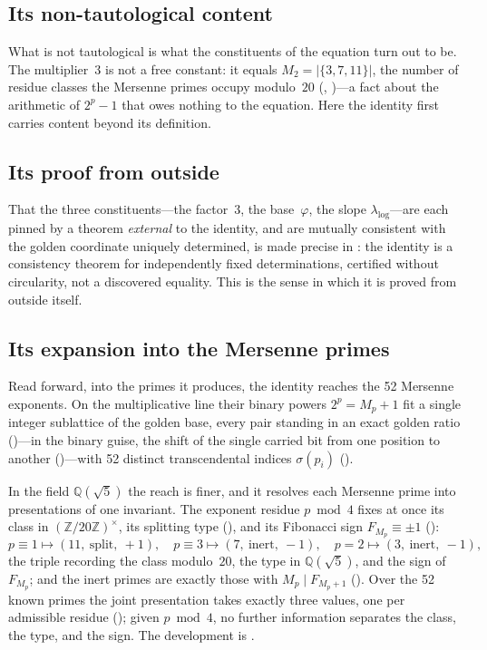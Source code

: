 \documentclass[11pt]{amsart}
\theoremstyle{definition}
\newcommand{\golden}{\varphi}
\newcommand{\Mp}{M_{p}}
\newcommand{\Ztwenty}{(\mathbb{Z}/20\mathbb{Z})^{\times}}
\begin{document}
\subsection*{Its non-tautological content}
What is not tautological is what the constituents of the equation turn out
to be.  The multiplier~$3$ is not a free constant: it equals
$M_{2}=|\{3,7,11\}|$, the number of residue classes the Mersenne primes
occupy modulo~$20$ (,
)---a fact about the arithmetic of $2^{p}-1$ that owes
nothing to the equation.  Here the identity first carries content beyond
its definition.

\subsection*{Its proof from outside}
That the three constituents---the factor~$3$, the base~$\golden$, the slope
$\lambda_{\log}$---are each pinned by a theorem \emph{external} to the
identity, and are mutually consistent with the golden coordinate uniquely
determined, is made precise in : the identity is
a consistency theorem for independently fixed determinations, certified
without circularity, not a discovered equality.  This is the sense in which
it is proved from outside itself.

\subsection*{Its expansion into the Mersenne primes}
Read forward, into the primes it produces, the identity reaches the 52
Mersenne exponents.  On the multiplicative line their binary powers
$2^{p}=\Mp+1$ fit a single integer sublattice of the golden base, every pair
standing in an exact golden ratio ()---in the binary
guise, the shift of the single carried bit from one position to another
()---with 52 distinct transcendental indices $\sigma(p_{i})$
().

In the field $\mathbb{Q}(\sqrt5)$ the reach is finer, and it resolves each
Mersenne prime into presentations of one invariant.  The exponent residue
$p\bmod4$ fixes at once its class in $\Ztwenty$, its splitting type
(), and its Fibonacci sign $F_{\Mp}\equiv\pm1$
():
\[
  p\equiv1\mapsto(11,\ \mathrm{split},\ +1),\quad
  p\equiv3\mapsto(7,\ \mathrm{inert},\ -1),\quad
  p=2\mapsto(3,\ \mathrm{inert},\ -1),
\]
the triple recording the class modulo~$20$, the type in $\mathbb{Q}(\sqrt5)$,
and the sign of $F_{\Mp}$; and the inert primes are exactly those with
$\Mp\mid F_{\Mp+1}$ ().  Over the 52 known primes the
joint presentation takes exactly three values, one per admissible residue
(); given $p\bmod4$, no further information separates the
class, the type, and the sign.  The development is .
\end{document}
